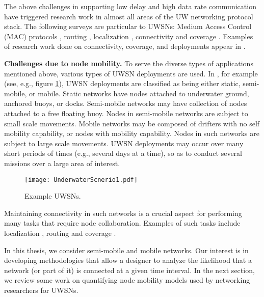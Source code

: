 The above challenges in supporting low delay and high data rate communication have triggered research work in almost all areas of the UW networking protocol stack.
The following surveys are particular to UWSNs: Medium Access Control (MAC) protocols \cite{Farrell2012, yunus2010survey, petrioli2008comparative, yigitel2011qos, chen2014}, routing  \cite{ayaz2011survey, pompili2006routing, bayrakdar2011comparative, giantsis2011comparison}, localization \cite{chandrasekhar2006localization, zhou2010efficient, zhou2011scalable, tan2011survey, erol2011performance}, connectivity and coverage \cite{ghosh2008coverage, zhu2012survey}.  Examples of research work done on connectivity, coverage, and deployments appear in \cite{senel2013autonomous, akkaya2009self, ammari2010study, Nazrul2008,  reza2009robust}.


\textbf{Challenges due to node mobility.} To serve the diverse types of applications mentioned above, various types of UWSN deployments are used.
In \cite{heidemann2012underwater}, for example (see, e.g., figure \ref{fig:Exm111}), UWSN deployments are
classified as being either static, semi-mobile, or mobile.
%
Static networks have nodes attached to underwater ground,
anchored buoys, or docks.
%
Semi-mobile networks may have collection of nodes attached to a
free floating buoy. Nodes in semi-mobile networks are subject to small scale
movements.
%
Mobile networks may be composed of drifters with no self mobility
capability, or nodes with mobility capability. Nodes in such networks
are subject to large scale movements.
%
UWSN deployments may occur over many short periods of times (e.g.,
several days at a time), so as to conduct several missions over
a large area of interest.
\begin{figure}[h]
\centering
\texttt{[image: UnderwaterScnerio1.pdf]}
 \caption{ Example UWSNs.}
 \label{fig:Exm111}
\end{figure}
Maintaining connectivity in such networks is a crucial aspect for performing many tasks that require node collaboration.
Examples of such tasks include localization \cite{teymorian20093d, erol2008multi, isik2009three, zhou2010efficient, zhou2011scalable, erol2011performance}, routing \cite{noh2013vapr, ying2011combining, lee2010pressure, ren2012performance} and coverage \cite{ammari2010study, senel2013autonomous, akkaya2009self, pompili2006deployment}.

In this thesis, we consider semi-mobile and mobile networks.
Our interest is in developing methodologies that allow a designer to analyze the likelihood that a network (or part of it) is connected at a given time interval.
In the next section, we review some work on quantifying node mobility models used by networking researchers for UWSNs.

